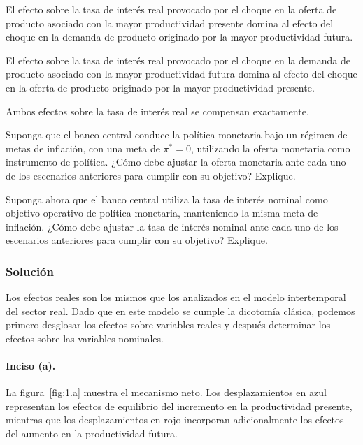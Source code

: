 \documentclass[11pt]{article}
\let\enumerateoriginal\enumerate
\let\endenumerateoriginal\endenumerate
\renewenvironment{enumerate}{%
  \enumerateoriginal
  \setlength{\itemsep}{0.5em}%
  \setlength{\parsep}{0pt}%
  \setlength{\topsep}{0.4em}%
}{\endenumerateoriginal}
\begin{document}
\begin{enumerate}
    \item El efecto sobre la tasa de interés real provocado por el choque en la oferta de producto asociado con la mayor productividad presente domina al efecto del choque en la demanda de producto originado por la mayor productividad futura.

    \item El efecto sobre la tasa de interés real provocado por el choque en la demanda de producto asociado con la mayor productividad futura domina al efecto del choque en la oferta de producto originado por la mayor productividad presente.

    \item Ambos efectos sobre la tasa de interés real se compensan exactamente.

    \item Suponga que el banco central conduce la política monetaria bajo un régimen de metas de inflación, con una meta de $\pi^*=0$, utilizando la oferta monetaria como instrumento de política. ¿Cómo debe ajustar la oferta monetaria ante cada uno de los escenarios anteriores para cumplir con su objetivo? Explique.

    \item Suponga ahora que el banco central utiliza la tasa de interés nominal como objetivo operativo de política monetaria, manteniendo la misma meta de inflación. ¿Cómo debe ajustar la tasa de interés nominal ante cada uno de los escenarios anteriores para cumplir con su objetivo? Explique.

\end{enumerate}



\subsubsection*{Solución}
Los efectos reales son los mismos que los analizados en el modelo intertemporal del sector real. Dado que en este modelo se cumple la dicotomía clásica, podemos primero desglosar los efectos sobre variables reales y después determinar los efectos sobre las variables nominales.

\paragraph{Inciso (a).} La figura~\ref{fig:1.a} muestra el mecanismo neto. Los desplazamientos en azul representan los efectos de equilibrio del incremento en la productividad presente, mientras que los desplazamientos en rojo incorporan adicionalmente los efectos del aumento en la productividad futura.
\end{document}
